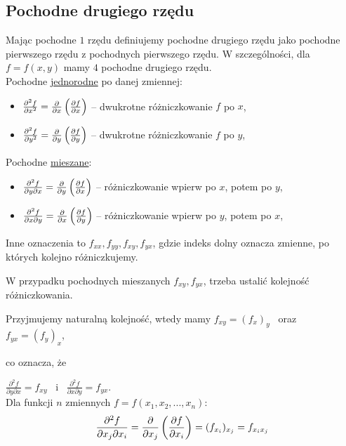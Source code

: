 \subsection{Pochodne drugiego rzędu}

Mając pochodne $1$ rzędu definiujemy pochodne drugiego rzędu jako pochodne pierwszego rzędu z pochodnych pierwszego rzędu.
W szczególności, dla $ f = f(x,y) $ mamy $4$ pochodne drugiego rzędu. \\

Pochodne \underline{jednorodne} po danej zmiennej:
\begin{itemize}
    \item $ \frac{\partial^2 f}{\partial x^2} = \frac{\partial }{\partial x} \left( \frac{\partial f}{\partial x} \right) $ -- dwukrotne różniczkowanie $f$ po $x$,
    \item $ \frac{\partial^2 f}{\partial y^2} = \frac{\partial }{\partial y} \left( \frac{\partial f}{\partial y} \right) $ -- dwukrotne różniczkowanie $f$ po $y$,
\end{itemize}

Pochodne \underline{mieszane}:

\begin{itemize}
    \item $ \frac{\partial^2 f}{\partial y \partial x} = \frac{\partial }{\partial y} \left( \frac{\partial f}{\partial x} \right) $ -- różniczkowanie wpierw po $x$, potem po $y$,
    \item $ \frac{\partial^2 f}{\partial x \partial y} = \frac{\partial }{\partial x} \left( \frac{\partial f}{\partial y} \right) $ -- różniczkowanie wpierw po $y$, potem po $x$, \\
\end{itemize}

Inne oznaczenia to $ f_{xx}, f_{yy}, f_{xy}, f_{yx} $, gdzie indeks dolny oznacza zmienne, po których kolejno różniczkujemy.

W przypadku pochodnych mieszanych $ f_{xy}, f_{yx} $, trzeba ustalić kolejność różniczkowania.

Przyjmujemy naturalną kolejność, wtedy mamy $ f_{xy} = (f_x)_y $ \ oraz \ $ f_{yx} = (f_y)_x $,

co oznacza, że 

$ \frac{\partial^2 f}{\partial y \partial x} = f_{xy} $ \ i \ $ \frac{\partial^2 f}{\partial x \partial y} = f_{yx} $. \\

Dla funkcji $n$ zmiennych $ f = f(x_1, x_2, ..., x_n) $:
$$ \frac{\partial^2 f}{\partial x_j \partial x_i} = \frac{\partial }{\partial x_j} \left( \frac{\partial f}{\partial x_i} \right) = (f_{x_i})_{x_j} = f_{x_i x_j} $$ \\

